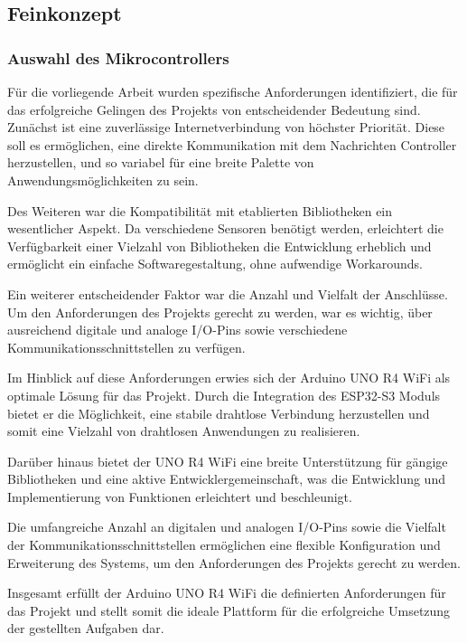 \subsection{Feinkonzept}

\subsubsection{Auswahl des Mikrocontrollers}
Für die vorliegende Arbeit wurden spezifische Anforderungen identifiziert, die für das erfolgreiche Gelingen des Projekts von entscheidender Bedeutung sind. Zunächst ist eine zuverlässige Internetverbindung von höchster Priorität. Diese soll es ermöglichen, eine direkte Kommunikation mit dem Nachrichten Controller herzustellen, und so variabel für eine breite Palette von Anwendungsmöglichkeiten zu sein.

Des Weiteren war die Kompatibilität mit etablierten Bibliotheken ein wesentlicher Aspekt. Da verschiedene Sensoren benötigt werden, erleichtert die Verfügbarkeit einer Vielzahl von Bibliotheken die Entwicklung erheblich und ermöglicht ein einfache Softwaregestaltung, ohne aufwendige Workarounds.

Ein weiterer entscheidender Faktor war die Anzahl und Vielfalt der Anschlüsse. Um den Anforderungen des Projekts gerecht zu werden, war es wichtig, über ausreichend digitale und analoge I/O-Pins sowie verschiedene Kommunikationsschnittstellen zu verfügen.

Im Hinblick auf diese Anforderungen erwies sich der Arduino UNO R4 WiFi als optimale Lösung für das Projekt.\cite{arduino-uno-r4-wifi} Durch die Integration des ESP32-S3 Moduls bietet er die Möglichkeit, eine stabile drahtlose Verbindung herzustellen und somit eine Vielzahl von drahtlosen Anwendungen zu realisieren.

Darüber hinaus bietet der UNO R4 WiFi eine breite Unterstützung für gängige Bibliotheken und eine aktive Entwicklergemeinschaft, was die Entwicklung und Implementierung von Funktionen erleichtert und beschleunigt.

Die umfangreiche Anzahl an digitalen und analogen I/O-Pins sowie die Vielfalt der Kommunikationsschnittstellen ermöglichen eine flexible Konfiguration und Erweiterung des Systems, um den Anforderungen des Projekts gerecht zu werden.

Insgesamt erfüllt der Arduino UNO R4 WiFi die definierten Anforderungen für das Projekt und stellt somit die ideale Plattform für die erfolgreiche Umsetzung der gestellten Aufgaben dar.

